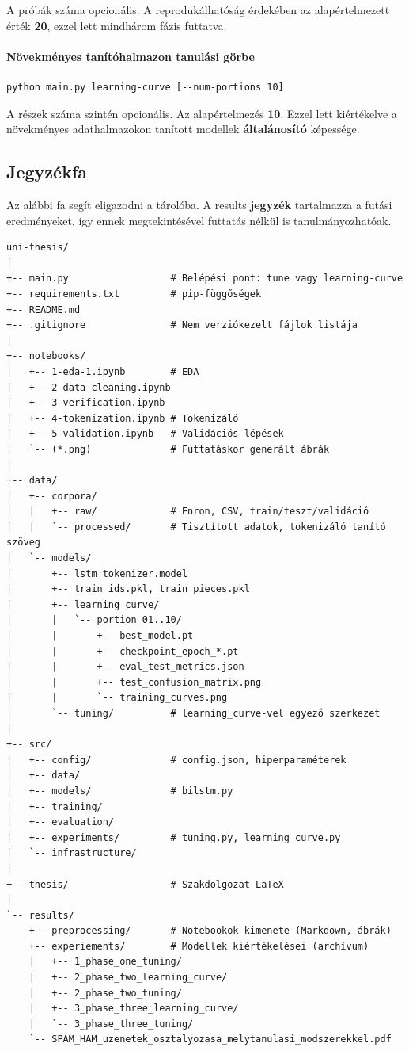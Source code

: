 \noindent
A próbák száma opcionális. A reprodukálhatóság érdekében az alapértelmezett érték \textbf{20}, ezzel lett mindhárom fázis futtatva.

\paragraph{Növekményes tanítóhalmazon tanulási görbe}

\begin{verbatim}
python main.py learning-curve [--num-portions 10]
\end{verbatim}

\noindent
A részek száma szintén opcionális. Az alapértelmezés \textbf{10}. Ezzel lett kiértékelve a növekményes adathalmazokon tanított modellek \textbf{általánosító} képessége.

\subsection*{Jegyzékfa}

Az alábbi fa segít eligazodni a tárolóba. A results \textbf{jegyzék} tartalmazza a futási eredményeket, így ennek megtekintésével futtatás nélkül is tanulmányozhatóak.

\begin{small}
\begin{verbatim}
uni-thesis/
|
+-- main.py                  # Belépési pont: tune vagy learning-curve
+-- requirements.txt         # pip-függőségek
+-- README.md
+-- .gitignore               # Nem verziókezelt fájlok listája
|
+-- notebooks/
|   +-- 1-eda-1.ipynb        # EDA
|   +-- 2-data-cleaning.ipynb
|   +-- 3-verification.ipynb
|   +-- 4-tokenization.ipynb # Tokenizáló
|   +-- 5-validation.ipynb   # Validációs lépések
|   `-- (*.png)              # Futtatáskor generált ábrák
|
+-- data/
|   +-- corpora/
|   |   +-- raw/             # Enron, CSV, train/teszt/validáció
|   |   `-- processed/       # Tisztított adatok, tokenizáló tanító szöveg
|   `-- models/              
|       +-- lstm_tokenizer.model
|       +-- train_ids.pkl, train_pieces.pkl
|       +-- learning_curve/
|       |   `-- portion_01..10/
|       |       +-- best_model.pt
|       |       +-- checkpoint_epoch_*.pt
|       |       +-- eval_test_metrics.json
|       |       +-- test_confusion_matrix.png
|       |       `-- training_curves.png
|       `-- tuning/          # learning_curve-vel egyező szerkezet
|
+-- src/
|   +-- config/              # config.json, hiperparaméterek
|   +-- data/                
|   +-- models/              # bilstm.py
|   +-- training/
|   +-- evaluation/
|   +-- experiments/         # tuning.py, learning_curve.py
|   `-- infrastructure/
|
+-- thesis/                  # Szakdolgozat LaTeX
|
`-- results/
    +-- preprocessing/       # Notebookok kimenete (Markdown, ábrák)
    +-- experiements/        # Modellek kiértékelései (archívum)
    |   +-- 1_phase_one_tuning/
    |   +-- 2_phase_two_learning_curve/
    |   +-- 2_phase_two_tuning/
    |   +-- 3_phase_three_learning_curve/
    |   `-- 3_phase_three_tuning/
    `-- SPAM_HAM_uzenetek_osztalyozasa_melytanulasi_modszerekkel.pdf
\end{verbatim}
\end{small}

